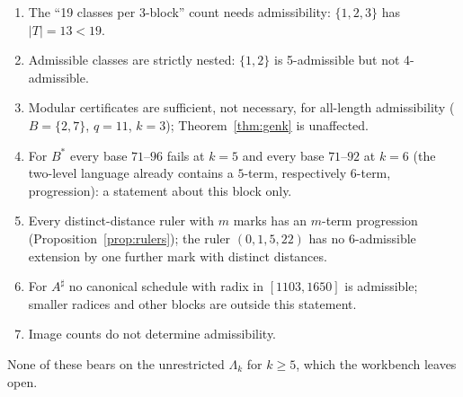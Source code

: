 \begin{enumerate}
\item The ``19 classes per 3-block'' count needs admissibility: $\{1,2,3\}$ has $|T|=13<19$.
\item Admissible classes are strictly nested: $\{1,2\}$ is 5-admissible but not 4-admissible.
\item Modular certificates are sufficient, not necessary, for all-length admissibility ($B=\{2,7\}$, $q=11$, $k=3$); Theorem~\ref{thm:genk} is unaffected.
\item For $B^*$ every base $71$--$96$ fails at $k=5$ and every base $71$--$92$ at $k=6$ (the two-level language already contains a $5$-term, respectively $6$-term, progression): a statement about this block only.
\item Every distinct-distance ruler with $m$ marks has an $m$-term progression (Proposition~\ref{prop:rulers}); the ruler $(0,1,5,22)$ has no 6-admissible extension by one further mark with distinct distances.
\item For $A^\sharp$ no canonical schedule with radix in $[1103,1650]$ is admissible; smaller radices and other blocks are outside this statement.
\item Image counts do not determine admissibility.
\end{enumerate}
None of these bears on the unrestricted $\Lambda_k$ for $k\ge5$, which the workbench leaves open.
